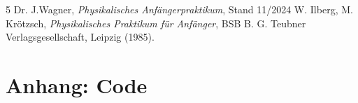 \documentclass[12pt,a4paper,titlepage]{scrartcl}
\numberwithin{equation}{section}
\numberwithin{table}{section}
\numberwithin{figure}{section}
\begin{document}
\clearpage

\listoffigures


\listoftables

\begin{thebibliography}{5}
     Dr. J.Wagner, \emph{Physikalisches Anfängerpraktikum}, Stand 11/2024
     W. Ilberg, M. Krötzsch, \emph{Physikalisches Praktikum für Anfänger}, BSB B. G. Teubner Verlagsgesellschaft, Leipzig (1985).
\end{thebibliography}


\appendix
\section{Anhang: Code}


\end{document}
